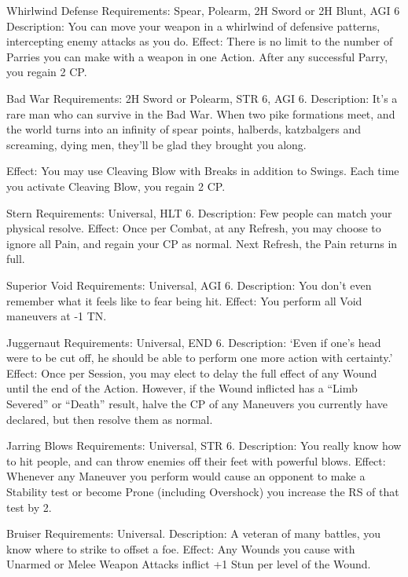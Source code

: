 \documentclass[oneside,11pt,english]{book}
\begin{document}
 

Whirlwind Defense 
Requirements: Spear, Polearm, 2H Sword or 2H Blunt, AGI 6 
Description: You can move your weapon in a whirlwind of defensive patterns, intercepting enemy 
attacks as you do. 
Effect: There is no limit to the number of Parries you can make with a weapon in one Action. After any 
successful Parry, you regain 2 CP. 

 

Bad War 
Requirements: 2H Sword or Polearm, STR 6, AGI 6. 
Description: It’s a rare man who can survive in the Bad War. When two pike formations meet, and the 
world turns into an infinity of spear points, halberds, katzbalgers and screaming, dying men, they’ll be 
glad they brought you along. 


Effect: You may use Cleaving Blow with Breaks in addition to Swings. Each time you activate Cleaving 
Blow, you regain 2 CP. 

 

Stern 
Requirements: Universal, HLT 6. 
Description: Few people can match your physical resolve. 
Effect: Once per Combat, at any Refresh, you may choose to ignore all Pain, and regain your CP as 
normal. Next Refresh, the Pain returns in full. 

 

Superior Void 
Requirements: Universal, AGI 6. 
Description: You don’t even remember what it feels like to fear being hit. 
Effect: You perform all Void maneuvers at -1 TN. 

 

Juggernaut 
Requirements: Universal, END 6. 
Description: ‘Even if one’s head were to be cut off, he should be able to perform one more action with 
certainty.’ 
Effect: Once per Session, you may elect to delay the full effect of any Wound until the end of the Action. 
However, if the Wound inflicted has a “Limb Severed” or “Death” result, halve the CP of any Maneuvers 
you currently have declared, but then resolve them as normal. 

 

Jarring Blows 
Requirements: Universal, STR 6. 
Description: You really know how to hit people, and can throw enemies off their feet with powerful 
blows. 
Effect: Whenever any Maneuver you perform would cause an opponent to make a Stability test or 
become Prone (including Overshock) you increase the RS of that test by 2. 

 

Bruiser 
Requirements: Universal. 
Description: A veteran of many battles, you know where to strike to offset a foe. 
Effect: Any Wounds you cause with Unarmed or Melee Weapon Attacks inflict +1 Stun per level of the 
Wound. 
\end{document}
